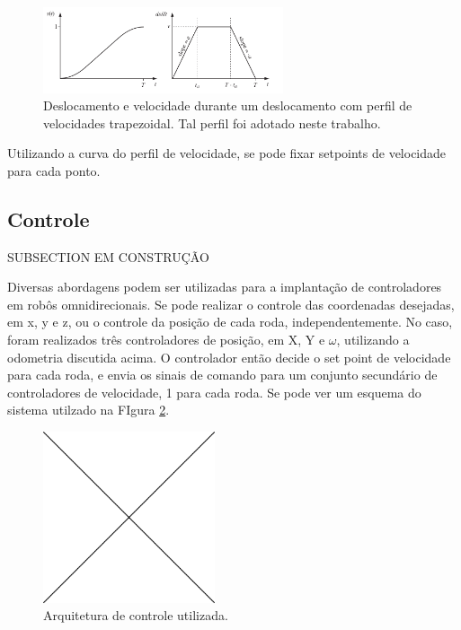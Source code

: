 \begin{figure}[h]
  \centering
  \includegraphics[width = 0.63\textwidth]{imagens/trapezoidal}
  \caption{Deslocamento e velocidade durante um deslocamento com perfil de velocidades trapezoidal. Tal perfil foi adotado neste trabalho.}
  \label{fig:trap}
\end{figure}

Utilizando a curva do perfil de velocidade, se pode fixar setpoints de velocidade para cada ponto.

\subsection{Controle}

SUBSECTION EM CONSTRUÇÃO

Diversas abordagens podem ser utilizadas para a implantação de controladores em robôs omnidirecionais. Se pode realizar o controle das coordenadas desejadas, em x, y e z, ou o controle da posição de cada roda, independentemente. No caso, foram realizados três controladores de posição, em X, Y e $\omega$, utilizando a odometria discutida acima. O controlador então decide o set point de velocidade para cada roda, e envia os sinais de comando para um conjunto secundário de controladores de velocidade, 1 para cada roda. Se pode ver um esquema do sistema utilzado na FIgura \ref{fig:controle}.

\begin{figure}[h]
  \centering
  \includegraphics[width = 0.45\textwidth]{imagens/edc}
  \caption{Arquitetura de controle utilizada.}
  \label{fig:controle}
\end{figure}

